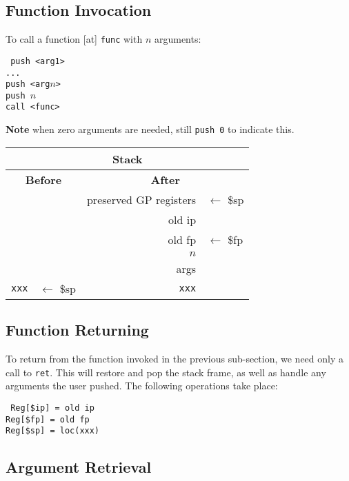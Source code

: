 \documentclass{article}
\begin{document}
\subsection{Function Invocation}

To call a function [at] \texttt{func} with \(n\) arguments:

\medskip
\texttt{%
push <arg1>\\%
...\\%
push <arg\(n\)>\\%
push \(n\)\\%
call <func>
}

\textbf{Note} when zero arguments are needed, still \texttt{push 0} to indicate this.
\medskip

\begin{tabular}{|r l||r l|}
     \hline
     \multicolumn{4}{|c|}{\textbf{Stack}} \\
     \hline
     \multicolumn{2}{|c||}{\textbf{Before}} & \multicolumn{2}{c|}{\textbf{After}} \\
     \hline
     & & preserved GP registers & \(\leftarrow\) \$sp \\
     & & old ip & \\
     & & old fp & \(\leftarrow\) \$fp \\
     & & \(n\) & \\
     & & args & \\
     \texttt{xxx} & \(\leftarrow\) \$sp & \texttt{xxx} & \\
     \hline
\end{tabular}

\subsection{Function Returning}

To return from the function invoked in the previous sub-section, we need only a call to \texttt{ret}.
This will restore and pop the stack frame, as well as handle any arguments the user pushed.
The following operations take place:

\texttt{%
Reg[\$ip] = old ip\\%
Reg[\$fp] = old fp\\%
Reg[\$sp] = loc(xxx)\\%
}

\subsection{Argument Retrieval}
\end{document}
